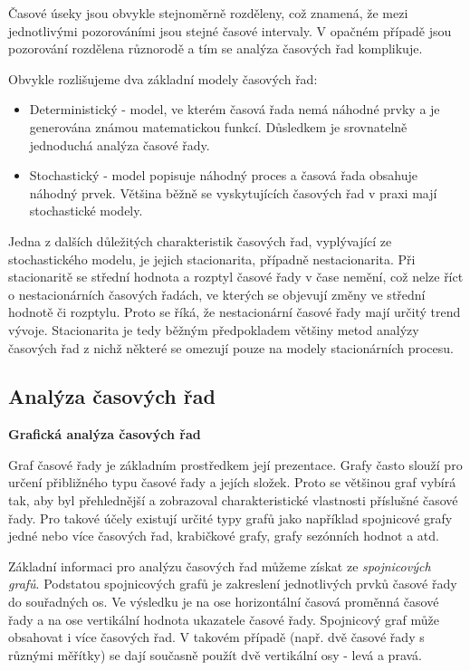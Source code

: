 \documentclass[a4paper,12pt,twoside]{scrreprt}
\begin{document}
Časové úseky jsou obvykle stejnoměrně rozděleny, což znamená, že mezi jednotlivými pozorováními jsou stejné časové intervaly. V opačném případě jsou pozorování rozdělena různorodě a tím se analýza časových řad komplikuje. 

\newpage

Obvykle rozlišujeme dva základní modely časových řad:
\begin{itemize}
\item Deterministický - model, ve kterém časová řada nemá náhodné prvky a je \\ generována známou matematickou funkcí. Důsledkem je srovnatelně jednoduchá analýza časové řady. 
\item Stochastický - model popisuje náhodný proces a časová řada obsahuje náhodný prvek. Většina běžně se vyskytujících časových řad v praxi mají stochastické modely.
\end{itemize}

Jedna z dalších důležitých charakteristik časových řad, vyplývající ze stochastického modelu, je jejich stacionarita, případně nestacionarita. Při stacionaritě se střední hodnota a rozptyl časové řady v čase nemění, což nelze říct o nestacionárních časových řadách, ve kterých se objevují změny ve střední hodnotě či rozptylu. Proto se říká, že nestacionární časové řady mají určitý trend vývoje. Stacionarita je tedy běžným předpokladem většiny metod analýzy časových řad z nichž některé se omezují pouze na modely stacionárních procesu.  


\subsection{Analýza časových řad}
\normalsize \textbf{Grafická analýza časových řad}

Graf časové řady je základním prostředkem její prezentace. Grafy často slouží pro určení přibližného typu časové řady a jejích složek. Proto se většinou graf vybírá tak, aby byl přehlednější a zobrazoval charakteristické vlastnosti příslušné časové řady. Pro takové účely existují určité typy grafů jako například spojnicové grafy jedné nebo více časových řad, krabičkové grafy, grafy sezónních hodnot a atd. 

Základní informaci pro analýzu časových řad můžeme získat ze \textit{spojnicových grafů}. Podstatou spojnicových grafů je zakreslení jednotlivých prvků časové řady do souřadných os. Ve výsledku je na ose horizontální časová proměnná časové řady a na ose vertikální hodnota ukazatele časové řady. Spojnicový graf může obsahovat i více časových řad. V takovém případě (např. dvě časové řady s různými měřítky) se dají současně použít dvě vertikální osy - levá a pravá.
\end{document}
